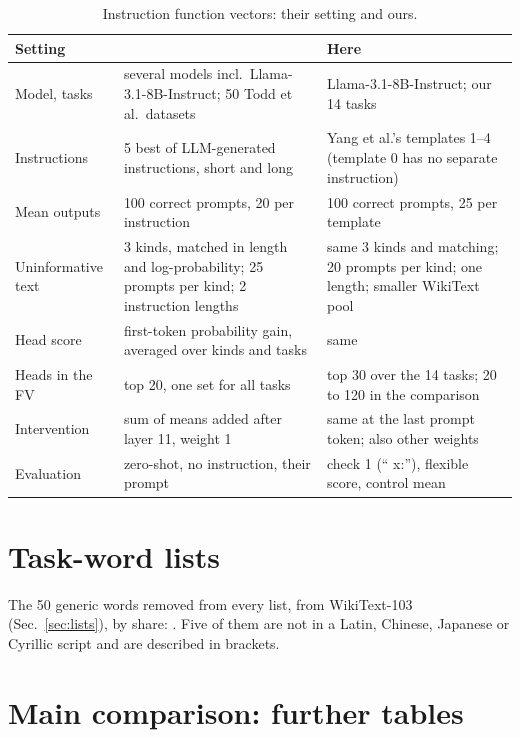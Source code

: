 \documentclass[10pt,a4paper]{article}
\begin{document}
\begin{table}[H]
\centering\small
\begin{tabularx}{\textwidth}{@{}>{\raggedright\arraybackslash}p{3.3cm}LL@{}}
\toprule
Setting & \citet{davidson2025different} & Here \\
\midrule
Model, tasks & several models incl.\ Llama-3.1-8B-Instruct; 50 Todd et al.\ datasets & Llama-3.1-8B-Instruct; our 14 tasks \\
Instructions & 5 best of LLM-generated instructions, short and long & Yang et al.'s templates 1--4 (template 0 has no separate instruction) \\
Mean outputs & 100 correct prompts, 20 per instruction & 100 correct prompts, 25 per template \\
Uninformative text & 3 kinds, matched in length and log-probability; 25 prompts per kind; 2 instruction lengths & same 3 kinds and matching; 20 prompts per kind; one length; smaller WikiText pool \\
Head score & first-token probability gain, averaged over kinds and tasks & same \\
Heads in the FV & top 20, one set for all tasks & top 30 over the 14 tasks; 20 to 120 in the comparison \\
Intervention & sum of means added after layer 11, weight 1 & same at the last prompt token; also other weights \\
Evaluation & zero-shot, no instruction, their prompt & check 1 (`` x:''), flexible score, control mean \\
\bottomrule
\end{tabularx}
\caption{Instruction function vectors: their setting and ours.}
\label{tab:fid-dav}
\end{table}

\section{Task-word lists}\label{app:lists}

The 50 generic words removed from every list, from WikiText-103 (Sec.~\ref{sec:lists}), by share: \unskip. Five of them are not in a Latin, Chinese, Japanese or Cyrillic script and are described in brackets.

\small

\normalsize

\section{Main comparison: further tables}\label{app:tables}
\end{document}

